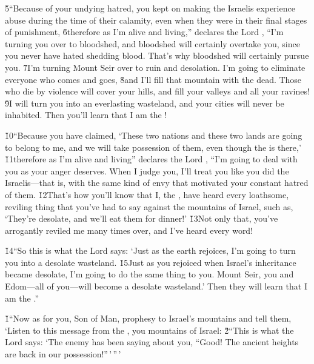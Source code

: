 \v{5}``Because of your undying hatred, you kept on making the Israelis experience abuse during the time of their calamity, even when they were in their final stages of punishment, \v{6}therefore as I'm alive and living,'' declares the Lord , ``I'm turning you over to bloodshed, and bloodshed will certainly overtake you, since you never have hated shedding blood. That's why bloodshed will certainly pursue you. \v{7}I'm turning Mount Seir over to ruin and desolation. I'm going to eliminate everyone who comes and goes, \v{8}and I'll fill that mountain with the dead. Those who die by violence will cover your hills, and fill your valleys and all your ravines! \v{9}I will turn you into an everlasting wasteland, and your cities will never be inhabited. Then you'll learn that I am the !

\v{10}``Because you have claimed, `These two nations and these two lands are going to belong to me, and we will take possession of them, even though the  is there,' \v{11}therefore as I'm alive and living'' declares the Lord , ``I'm going to deal with you as your anger deserves. When I judge you, I'll treat you like you did the Israelis---that is, with the same kind of envy that motivated your constant hatred of them. \v{12}That's how you'll know that I, the , have heard every loathsome, reviling thing that you've had to say against the mountains of Israel, such as, `They're desolate, and we'll eat them for dinner!' \v{13}Not only that, you've arrogantly reviled me many times over, and I've heard every word!

\v{14}``So this is what the Lord  says: `Just as the earth rejoices, I'm going to turn you into a desolate wasteland. \v{15}Just as you rejoiced when Israel's inheritance became desolate, I'm going to do the same thing to you. Mount Seir, you and Edom---all of you---will become a desolate wasteland.' Then they will learn that I am the .''

\v{1}``Now as for you, Son of Man, prophesy to Israel's mountains and tell them, `Listen to this message from the , you mountains of Israel: \v{2}``This is what the Lord  says: `The enemy has been saying about you, ``Good! The ancient heights are back in our possession!''\,'\,''\,'

